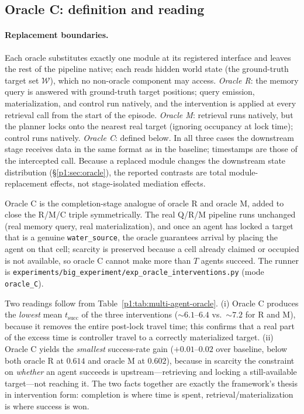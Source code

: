 \documentclass{article}
\newcommand{\method}[1]{\texttt{#1}}
\begin{document}
\subsection{Oracle C: definition and reading}
\label{p1:app:oracle-c-def}

\paragraph{Replacement boundaries.} Each oracle substitutes exactly one module at its registered interface and leaves the rest of the pipeline native; each reads hidden world state (the ground-truth target set $\mathcal{W}$), which no non-oracle component may access. \emph{Oracle R}: the memory query is answered with ground-truth target positions; query emission, materialization, and control run natively, and the intervention is applied at every retrieval call from the start of the episode. \emph{Oracle M}: retrieval runs natively, but the planner locks onto the nearest real target (ignoring occupancy at lock time); control runs natively. \emph{Oracle C}: defined below. In all three cases the downstream stage receives data in the same format as in the baseline; timestamps are those of the intercepted call. Because a replaced module changes the downstream state distribution (\S\ref{p1:sec:oracle}), the reported contrasts are total module-replacement effects, not stage-isolated mediation effects.

Oracle C is the completion-stage analogue of oracle R and oracle M, added to close the R/M/C triple symmetrically. The real Q/R/M pipeline runs unchanged (real memory query, real materialization), and once an agent has locked a target that is a genuine \texttt{water\_source}, the oracle guarantees arrival by placing the agent on that cell; scarcity is preserved because a cell already claimed or occupied is not available, so oracle C cannot make more than $T$ agents succeed. The runner is \method{experiments/big\_experiment/exp\_oracle\_interventions.py} (mode \method{oracle\_C}).

Two readings follow from Table~\ref{p1:tab:multi-agent-oracle}. (i) Oracle C produces the \emph{lowest} mean $t_{\mathrm{succ}}$ of the three interventions ($\sim6.1$--$6.4$ vs.\ $\sim7.2$ for R and M), because it removes the entire post-lock travel time; this confirms that a real part of the excess time is controller travel to a correctly materialized target. (ii) Oracle C yields the \emph{smallest} success-rate gain ($+0.01$--$0.02$ over baseline, below both oracle R at $0.614$ and oracle M at $0.602$), because in scarcity the constraint on \emph{whether} an agent succeeds is upstream---retrieving and locking a still-available target---not reaching it. The two facts together are exactly the framework's thesis in intervention form: completion is where time is spent, retrieval/materialization is where success is won.
\end{document}
